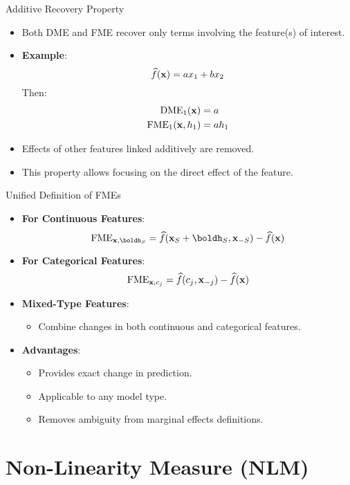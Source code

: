 \documentclass[11pt,compress,t,notes=noshow, aspectratio=169, xcolor=table]{beamer}
\begin{document}
\begin{frame}{Additive Recovery Property}
\begin{itemize}
\item Both DME and FME recover only terms involving the feature(s) of interest.
\item \textbf{Example}:
\[
\widehat{f}(\xv) = a x_1 + b x_2
\]
Then:
\begin{align*}
\text{DME}_1(\xv) &= a \\
\text{FME}_1(\xv, h_1) &= a h_1
\end{align*}
\item Effects of other features linked additively are removed.
\item This property allows focusing on the direct effect of the feature.
\end{itemize}
\end{frame}

\begin{frame}{Unified Definition of FMEs}
\begin{itemize}
\item \textbf{For Continuous Features}:
\[
\text{FME}_{\xv, \boldh_S} = \widehat{f}(\xv_S + \boldh_S, \xv_{-S}) - \widehat{f}(\xv)
\]
\item \textbf{For Categorical Features}:
\[
\text{FME}_{\xv, c_j} = \widehat{f}(c_j, \xv_{-j}) - \widehat{f}(\xv)
\]
\item \textbf{Mixed-Type Features}:
\begin{itemize}
\item Combine changes in both continuous and categorical features.
\end{itemize}
\item \textbf{Advantages}:
\begin{itemize}
\item Provides exact change in prediction.
\item Applicable to any model type.
\item Removes ambiguity from marginal effects definitions.
\end{itemize}
\end{itemize}
\end{frame}

\section{Non-Linearity Measure (NLM)}
\end{document}
